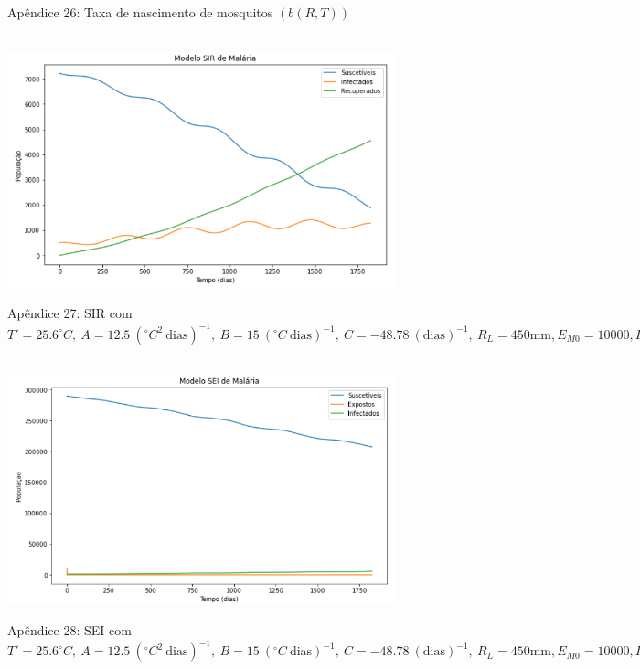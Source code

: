 \documentclass[
	12pt,				%
	oneside,			%
	a4paper,			%
	english,			%
	brazil				%
	]{abntex2}
\begin{document}
\begin{apendicesenv}
\begin{figure}[!ht]
	\caption*{Apêndice 26: Taxa de nascimento de mosquitos $(b(R,T))$} 
\end{figure} 
\newpage
\begin{figure}[!ht]
	\centering
	\hbox{\hspace{2.7em} \includegraphics[scale=0.7] {SIR_Entrada_Pop_10000_500_Infect.png}}
	\caption*{Apêndice 27: SIR com $T'=25.6^\circ C, \ A=12.5 \ (^\circ C^2 \ \text{dias})^{-1}, \ B=15 \ (^\circ C \ \text{dias})^{-1}, \ C=-48.78 \ (\text{dias})^{-1}, \ R_L=450 \text{mm}, E_{M0}=10000, I_{H0}=500$} 
\end{figure} 
\begin{figure}[!ht]
	\centering
	\hbox{\hspace{2.5em} \includegraphics[scale=0.7] {SEI_Entrada_Pop_10000_500_Infect.png}}
	\caption*{Apêndice 28: SEI com $T'=25.6^\circ C, \ A=12.5 \ (^\circ C^2 \ \text{dias})^{-1}, \ B=15 \ (^\circ C \ \text{dias})^{-1}, \ C=-48.78 \ (\text{dias})^{-1}, \ R_L=450 \text{mm}, E_{M0}=10000, I_{H0}=500$} 
\end{figure} 
\newpage

\end{apendicesenv}
\end{document}
